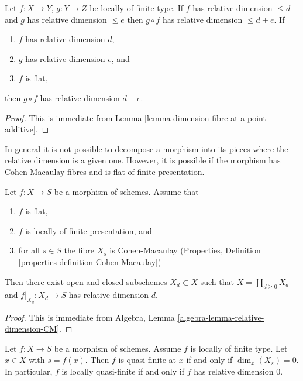 \begin{lemma}
\label{lemma-composition-relative-dimension-d}
Let $f : X \to Y$, $g : Y \to Z$ be locally of finite type.
If $f$ has relative dimension $\leq d$ and $g$ has relative dimension $\leq e$
then $g \circ f$ has relative dimension $\leq d + e$.
If
\begin{enumerate}
\item $f$ has relative dimension $d$,
\item $g$ has relative dimension $e$, and
\item $f$ is flat,
\end{enumerate}
then $g \circ f$ has relative dimension $d + e$.
\end{lemma}

\begin{proof}
This is immediate from Lemma \ref{lemma-dimension-fibre-at-a-point-additive}.
\end{proof}

\noindent
In general it is not possible to decompose a morphism
into its pieces where the relative dimension is a given
one. However, it is possible if the morphism has Cohen-Macaulay
fibres and is flat of finite presentation.

\begin{lemma}
\label{lemma-flat-finite-presentation-CM-fibres-relative-dimension}
Let $f : X \to S$ be a morphism of schemes.
Assume that
\begin{enumerate}
\item $f$ is flat,
\item $f$ is locally of finite presentation, and
\item for all $s \in S$ the fibre $X_s$ is Cohen-Macaulay
(Properties, Definition \ref{properties-definition-Cohen-Macaulay})
\end{enumerate}
Then there exist open and closed subschemes $X_d \subset X$
such that $X = \coprod_{d \geq 0} X_d$ and $f|_{X_d} : X_d \to S$
has relative dimension $d$.
\end{lemma}

\begin{proof}
This is immediate from
Algebra, Lemma
\ref{algebra-lemma-relative-dimension-CM}.
\end{proof}

\begin{lemma}
\label{lemma-locally-quasi-finite-rel-dimension-0}
Let $f : X \to S$ be a morphism of schemes.
Assume $f$ is locally of finite type.
Let $x \in X$ with $s = f(x)$.
Then $f$ is quasi-finite at $x$ if and only if $\dim_x(X_s) = 0$.
In particular, $f$ is locally quasi-finite if and only if $f$ has relative
dimension $0$.
\end{lemma}

